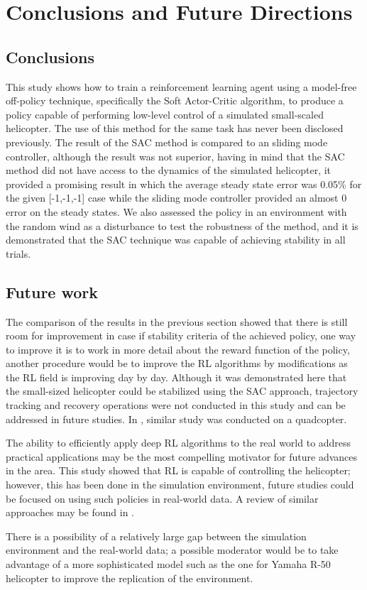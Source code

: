 \chapter{Conclusions and Future Directions}

\section{Conclusions}

This study shows how to train a reinforcement learning agent using a model-free off-policy technique, specifically the Soft Actor-Critic algorithm, to produce a policy capable of performing low-level control of a simulated small-scaled helicopter. The use of this method for the same task has never been disclosed previously. The result of the SAC method is compared to an sliding mode controller, although the result was not superior, having in mind that the SAC method did not have access to the dynamics of the simulated helicopter, it provided a promising result in which the average steady state error was 0.05\% for the given [-1,-1,-1] case while the sliding mode controller provided an almost 0 error on the steady states. We also assessed the policy in an environment with the random wind as a disturbance to test the robustness of the method, and it is demonstrated that the SAC technique was capable of achieving stability in all trials. 

\section{Future work}
The comparison of the results in the previous section showed that there is still room for improvement in case if stability criteria of the achieved policy, one way to improve it is to work in more detail about the reward function of the policy, another procedure would be to improve the RL algorithms by modifications as the RL field is improving day by day. 
Although it was demonstrated here that the small-sized helicopter could be stabilized using the SAC approach, trajectory tracking and recovery operations were not conducted in this study and can be addressed in future studies. In \cite{barros2020using}, similar study was conducted on a quadcopter.

The ability to efficiently apply deep RL algorithms to the real world to address practical applications may be the most compelling motivator for future advances in the area.
This study showed that RL is capable of controlling the helicopter; however, this has been done in the simulation environment, future studies could be focused on using such policies in real-world data. A review of similar approaches may be found in \cite{zhao2020sim}.

There is a possibility of a relatively large gap between the simulation environment and the real-world data; a possible moderator would be to take advantage of a more sophisticated model such as the one for Yamaha R-50 helicopter \cite{la2003integrated,civita2006design} to improve the replication of the environment.






